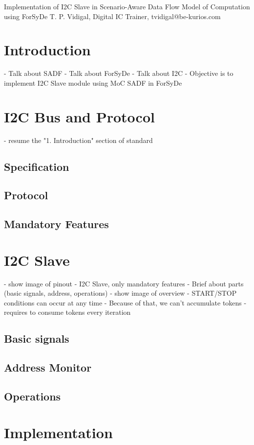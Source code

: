 Implementation of I2C Slave in Scenario-Aware Data Flow Model of Computation using ForSyDe
T. P. Vidigal, Digital IC Trainer, tvidigal@be-kurios.com

\section{Introduction}
- Talk about SADF
- Talk about ForSyDe
- Talk about I2C
- Objective is to implement I2C Slave module using MoC SADF in ForSyDe

\section{I2C Bus and Protocol}
- resume the "1. Introduction" section of standard
\subsection{Specification}
\subsection{Protocol}
\subsection{Mandatory Features}

\section{I2C Slave}
- show image of pinout
- I2C Slave, only mandatory features
- Brief about parts (basic signals, address, operations)
- show image of overview
- START/STOP conditions can occur at any time
- Because of that, we can't accumulate tokens
- requires to consume tokens every iteration
\subsection{Basic signals}
\subsection{Address Monitor}
\subsection{Operations}

\section{Implementation}
